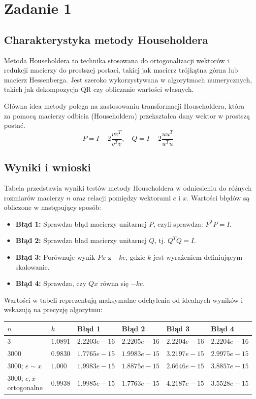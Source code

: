 \section{Zadanie 1}

\subsection{Charakterystyka metody Householdera}

Metoda Householdera to technika stosowana do ortogonalizacji wektorów i redukcji macierzy do prostszej postaci, takiej jak macierz trójkątna górna lub macierz Hessenberga. Jest szeroko wykorzystywana w algorytmach numerycznych, takich jak dekompozycja QR czy obliczanie wartości własnych.

Główna idea metody polega na zastosowaniu transformacji Householdera, która za pomocą macierzy odbicia (Householdera) przekształca dany wektor w prostszą postać.
\[
P = I - 2 \frac{v v^T}{v^T v}, \quad Q = I - 2\frac{uu^T}{u^Tu}
\]


\subsection{Wyniki i wnioski}

Tabela przedstawia wyniki testów metody Householdera w odniesieniu do różnych rozmiarów macierzy \( n \) oraz relacji pomiędzy wektorami \( e \) i \( x \). Wartości błędów są obliczone w następujący sposób:  
\begin{itemize}
\item \textbf{Błąd 1:} Sprawdza błąd macierzy unitarnej \( P \), czyli sprawdza: \( P^T P = I \).  
\item \textbf{Błąd 2:} Sprawdza bład macierzy unitarnej \( Q \), tj. \( Q^T Q = I \).  
\item \textbf{Błąd 3:} Porównuje wynik \( P x \) z \(-k e\), gdzie \( k \) jest wyrażeniem definiującym skalowanie.  
\item \textbf{Błąd 4:} Sprawdza, czy \( Q x \) równa się \(-k e\).  
\end{itemize}
Wartości w tabeli reprezentują maksymalne odchylenia od idealnych wyników i wskazują na precyzję algorytmu:  

\begin{center}
\begin{tabular}{@{}|l|l|l|l|l|l|@{}}
\hline
$n$                        & $k$       & Błąd 1       & Błąd 2       & Błąd 3       & Błąd 4       \\ \hline
$3$                        & $1.0891$  & $2.2203e-16$ & $2.2205e-16$ & $2.2204e-16$ & $2.2204e-16$ \\ \hline
$3000$                     & $0.9830$  & $1.7765e-15$ & $1.9983e-15$ & $3.2197e-15$ & $2.9975e-15$ \\ \hline
$3000$; $e \sim x$         & $1.000$   & $1.9983e-15$ & $1.8875e-15$ & $2.6646e-15$ & $3.8857e-15$ \\ \hline
$3000$; $e, x$ - ortogonalne & $0.9938$ & $1.9985e-15$ & $1.7763e-15$ & $4.2187e-15$ & $3.5528e-15$ \\ \hline
\end{tabular}
\end{center}

